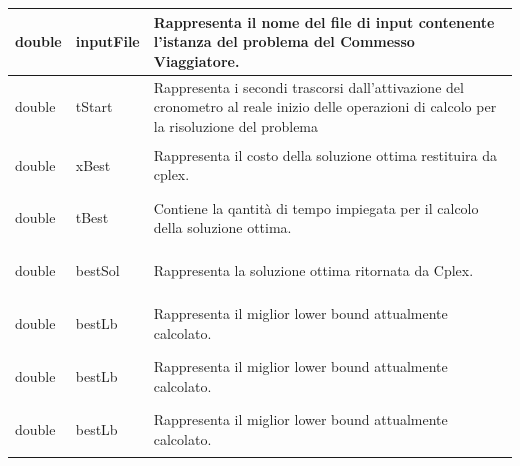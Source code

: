 \documentclass[11pt]{article}
\begin{document}
\begin{center}
\begin{longtable}{ | p{4cm} | p{4cm} | p{7cm} |}
    \begin{center} double \end{center} & \begin{center} inputFile \end{center}&\vfill Rappresenta il nome del file di input contenente l'istanza del problema del Commesso Viaggiatore. \vfill\\ \hline
    \begin{center} double \end{center} & \begin{center} tStart \end{center}& \vfill Rappresenta i secondi trascorsi dall'attivazione del cronometro al reale inizio delle operazioni di calcolo per la risoluzione del problema \vfill \\ \hline
    \begin{center} double \end{center} & \begin{center} xBest \end{center}& \vfill Rappresenta il costo della soluzione ottima restituira da cplex.\vfill \\ \hline
    \begin{center} double \end{center} & \begin{center} tBest \end{center}& \vfill Contiene la qantit\`a di tempo impiegata per il calcolo della soluzione ottima. \vfill \\ \hline
    \begin{center} double \end{center} & \begin{center} bestSol \end{center}& \vfill Rappresenta la soluzione ottima ritornata da Cplex.\vfill \\ \hline
     \begin{center} double \end{center} & \begin{center} bestLb \end{center}& \vfill Rappresenta il miglior lower bound attualmente calcolato.\vfill \\ \hline
    \begin{center} double \end{center} & \begin{center} bestLb \end{center}& \vfill Rappresenta il miglior lower bound attualmente calcolato.\vfill \\ \hline
     \begin{center} double \end{center} & \begin{center} bestLb \end{center}& \vfill Rappresenta il miglior lower bound attualmente calcolato.\vfill \\ \hline
    \end{longtable}
\end{center}
\end{document}
